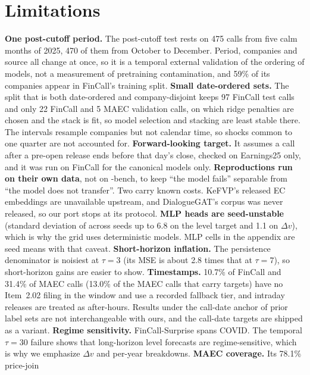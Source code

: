 \newpage
\section*{Limitations}

\textbf{One post-cutoff period.} The post-cutoff test rests on 475 calls from
five calm months of 2025, 470 of them from October to December. Period, companies and source all change at once, so it is a
temporal external validation of the ordering of models, not a measurement of
pretraining contamination, and 59\% of its companies appear in FinCall's training
split. \textbf{Small date-ordered sets.} The split that is both date-ordered and
company-disjoint keeps 97 FinCall test calls and only 22 FinCall and 5 MAEC
validation calls, on which ridge penalties are chosen and the stack is fit, so
model selection and stacking are least stable there. The intervals resample
companies but not calendar time, so shocks common to one quarter are not
accounted for. \textbf{Forward-looking target.} It assumes a
call after a pre-open release ends before that day's close, checked on
Earnings25 only, and it was run on FinCall for the canonical models only.
\textbf{Reproductions run on their own data}, not on \ecvol-bench, to keep ``the
model fails'' separable from ``the model does not transfer''. Two carry known
costs. KeFVP's released EC embeddings are unavailable upstream, and DialogueGAT's
corpus was never released, so our port stops at its protocol. \textbf{MLP heads
are seed-unstable} (standard deviation of \Rtwo{} across seeds up to 6.8 on the
level target and 1.1 on $\Delta v$), which is why the grid uses deterministic
models. MLP cells in the appendix are seed means with that caveat.
\textbf{Short-horizon \Rtwo{} inflation.} The persistence denominator is noisiest
at $\tau{=}3$ (its MSE is about 2.8 times that at $\tau{=}7$), so short-horizon
gains are easier to show. \textbf{Timestamps.} 10.7\% of FinCall and 31.4\% of
MAEC calls (13.0\% of the MAEC calls that carry targets) have no Item~2.02 filing
in the window and use a recorded fallback tier, and intraday releases are treated
as after-hours. Results under the
call-date anchor of prior label sets are not interchangeable with ours, and the
call-date targets are shipped as a variant. \textbf{Regime sensitivity.}
FinCall-Surprise spans COVID. The temporal $\tau{=}30$ failure shows that
long-horizon level forecasts are regime-sensitive, which is why we emphasize
$\Delta v$ and per-year breakdowns. \textbf{MAEC coverage.} Its 78.1\% price-join
